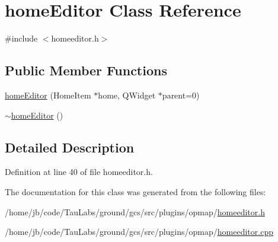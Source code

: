 \hypertarget{classhome_editor}{\section{home\-Editor \-Class \-Reference}
\label{classhome_editor}
}


{\ttfamily \#include $<$homeeditor.\-h$>$}

\subsection*{\-Public \-Member \-Functions}
\begin{DoxyCompactItemize}
\item 
\hyperlink{group___o_p_map_plugin_ga0036d5e97a686e97c193d02489b4d5fb}{home\-Editor} (\-Home\-Item $\ast$home, \-Q\-Widget $\ast$parent=0)
\item 
\hyperlink{group___o_p_map_plugin_ga774f5e26cbfa6c2c2fe3fb6a9317abcf}{$\sim$home\-Editor} ()
\end{DoxyCompactItemize}


\subsection{\-Detailed \-Description}


\-Definition at line 40 of file homeeditor.\-h.



\-The documentation for this class was generated from the following files\-:\begin{DoxyCompactItemize}
\item 
/home/jb/code/\-Tau\-Labs/ground/gcs/src/plugins/opmap/\hyperlink{homeeditor_8h}{homeeditor.\-h}\item 
/home/jb/code/\-Tau\-Labs/ground/gcs/src/plugins/opmap/\hyperlink{homeeditor_8cpp}{homeeditor.\-cpp}\end{DoxyCompactItemize}
